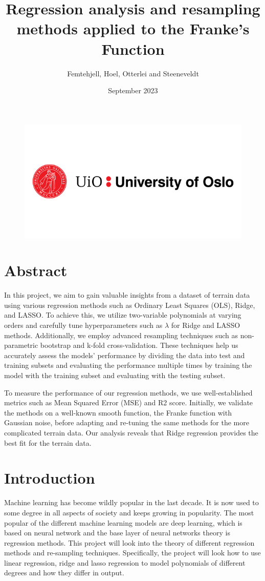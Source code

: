 \documentclass{article}
\title{Regression analysis and resampling methods applied to the Franke's Function}
\author{Femtehjell, Hoel, Otterlei and Steeneveldt}
\date{September 2023}
\begin{document}
\maketitle
\begin{figure}[H]
    \centering
    \includegraphics[scale=0.5]{Project1/1797261_uio-logo.png}
\end{figure}
\newpage
\tableofcontents
\newpage

\section*{Abstract}

In this project, we aim to gain valuable insights from a dataset of terrain data using various regression methods such as Ordinary Least Squares (OLS), Ridge, and LASSO. To achieve this, we utilize two-variable polynomials at varying orders and carefully tune hyperparameters such as $\lambda$ for Ridge and LASSO methods. Additionally, we employ advanced resampling techniques such as non-parametric bootstrap and k-fold cross-validation. These techniques help us accurately assess the models' performance by dividing the data into test and training subsets and evaluating the performance multiple times by training the model with the training subset and evaluating with the testing subset.

To measure the performance of our regression methods, we use well-established metrics such as Mean Squared Error (MSE) and R2 score. Initially, we validate the methods on a well-known smooth function, the Franke function with Gaussian noise, before adapting and re-tuning the same methods for the more complicated terrain data. Our analysis reveals that Ridge regression provides the best fit for the terrain data.

\section{Introduction}
Machine learning has become wildly popular in the last decade. It is now used to some degree in all aspects of society and keeps growing in popularity. The most popular of the different machine learning models are deep learning, which is based on neural network and the base layer of neural networks theory is regression methods. This project will look into the theory of different regression methods and re-sampling techniques. Specifically, the project will look how to use linear regression, ridge and lasso regression to model polynomials of different degrees and how they differ in output.
\end{document}
